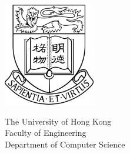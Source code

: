\begin{titlepage}
\addtocounter{page}{-1}
\begin{center}

\begin{center}
    \includegraphics[width=0.3\textwidth]{Covers/hkulogo_hb.jpg} %
\end{center}

\vspace{40pt} %

\begin{center}
    {The University of Hong Kong}\\[10pt] %
    {Faculty of Engineering}\\[10pt] %
    {Department of Computer Science}\\[25pt] %
\end{center}

 

\end{center}
\end{titlepage}
